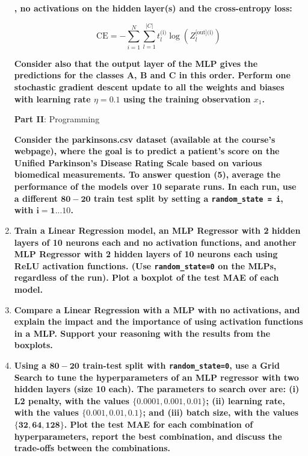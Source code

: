 \documentclass[12pt]{article}
\begin{document}
\begin{enumerate}
\textbf{, no activations on the hidden layer(s) and the cross-entropy loss:}

\begin{equation*}
    \text{CE} = -\sum_{i=1}^{N}\sum_{l=1}^{|C|} t_{l}^{\text{(i)}} \log(Z_{l}^{\text{[out](i)}})
\end{equation*}

\textbf{Consider also that the output layer of the MLP gives the predictions for the classes A, B and C in this order. Perform one
stochastic gradient descent update to all the weights and biases with learning rate $\eta = 0.1$
using the training observation $x_1$.}

\vspace{20pt}
\large{\textbf{Part II}: Programming}\normalsize

\vspace{10pt}
\textbf{Consider the parkinsons.csv dataset (available at the course's webpage), where the goal is
to predict a patient's score on the Unified Parkinson's Disease Rating Scale based on various
biomedical measurements.
To answer question (5), average the performance of the models over 10 separate runs. In each
run, use a different $\mathbf{80-20}$ train test split by setting a \texttt{random\_state = i}, with $\mathbf{i=1...10}$.}


\item \textbf{Train a Linear Regression model, an MLP Regressor with 2 hidden layers of 10
neurons each and no activation functions, and another MLP Regressor with 2 hidden
layers of 10 neurons each using ReLU activation functions. (Use \texttt{random\_state=0} on the
MLPs, regardless of the run). Plot a boxplot of the test MAE of each model.}

\item \textbf{Compare a Linear Regression with a MLP with no activations, and explain the impact
and the importance of using activation functions in a MLP. Support your reasoning with the
results from the boxplots.}

\item \textbf{Using a $\mathbf{80-20}$ train-test split with \texttt{random\_state=0}, use a Grid Search to tune the
hyperparameters of an MLP regressor with two hidden layers (size 10 each). The
parameters to search over are: (i) L2 penalty, with the values $\mathbf{\{0.0001, 0.001, 0.01\}}$; (ii)
learning rate, with the values $\mathbf{\{0.001, 0.01, 0.1\}}$; and (iii) batch size, with the values
$\mathbf{\{32, 64, 128\}}$. Plot the test MAE for each combination of hyperparameters, report the
best combination, and discuss the trade-oﬀs between the combinations.}
\end{enumerate}
\end{document}
